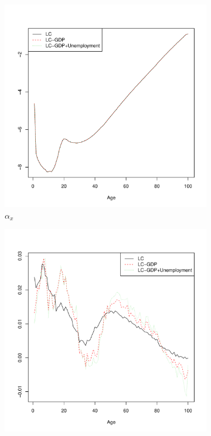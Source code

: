 \documentclass[AER, draftmode]{AEA}
\begin{document}
\begin{figure}[!htp]
	\begin{subfigure}{0.4\textwidth}
		\includegraphics[width=\linewidth]{CAN_ax_male}
		\caption{$\alpha_x$}
		\label{fig:malea}
	\end{subfigure}
	\begin{subfigure}{0.4\textwidth}
		\includegraphics[width=\linewidth]{CAN_bx_male}

\end{subfigure}
\end{figure}
\end{document}
